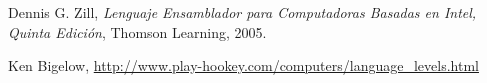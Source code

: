 

\begin{thebibliography}{9}

Dennis G. Zill, \textit{Lenguaje Ensamblador para Computadoras Basadas en Intel, Quinta Edición}, Thomson Learning, 2005. 

Ken Bigelow, \url{http://www.play-hookey.com/computers/language_levels.html}


\end{thebibliography}

